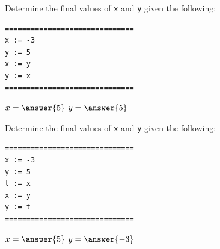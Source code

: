 \documentclass{ximera}
\begin{document}
\begin{question}
	Determine the final values of \verb|x| and \verb|y| given the following:
	\begin{verbatim}
==============================
x := -3
y := 5
x := y
y := x
==============================
	\end{verbatim}
	$x = \answer{5}$
	$y = \answer{5}$
\end{question}

\begin{question}
	Determine the final values of \verb|x| and \verb|y| given the following:
	\begin{verbatim}
==============================
x := -3
y := 5
t := x
x := y
y := t
==============================
	\end{verbatim}
	$x = \answer{5}$
	$y = \answer{-3}$
\end{question}
\end{document}
